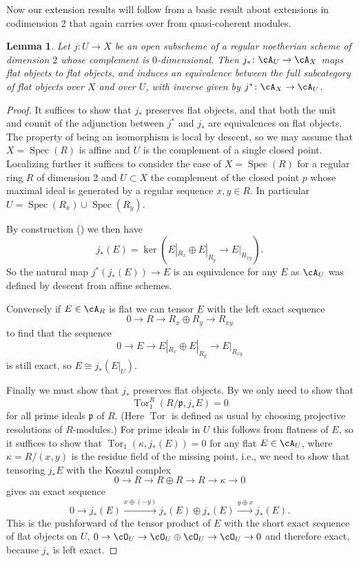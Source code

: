 \documentclass[a4paper]{amsart}
\numberwithin{equation}{section}
\theoremstyle{plain}
\newtheorem{lem}[thm]{Lemma}
\theoremstyle{definition}
\DeclareMathOperator{\Spec}{Spec}
\DeclareMathOperator{\Tor}{Tor}
\newcommand{\co}{\colon}
\def\cp{\mathfrak{p}}
\begin{document}
Now our extension results will follow from a basic result about extensions in codimension 2 that again carries over from quasi-coherent modules.

\begin{lem} \label{L:abelian_flatness}
	Let $j \co U \to X$ be an open subscheme of a regular noetherian scheme of dimension $2$ whose complement is $0$-dimensional. Then $j_\ast \co\cA_{U} \to \cA_X$ maps flat objects to flat objects, and induces an equivalence between the full subcategory of flat objects over $X$ and over $U$, with inverse given by $j^\ast \co \cA_X \to \cA_U$.
\end{lem}
\begin{proof}
	It suffices to show that $j_\ast$ preserves flat objects, and that both the unit and counit of the adjunction between $j^\ast$ and $j_\ast$ are equivalences on flat objects. The property of being an isomorphism is local by descent, so we may assume that $X = \Spec(R)$ is affine and $U$ is the complement of a single closed point. Localizing further it suffices to consider the case of $X = \Spec(R)$ for a regular ring $R$ of dimension $2$ and $U \subset X$ the complement of the closed point $p$ whose maximal ideal is generated by a regular sequence $x,y \in R$. In particular $U=\Spec(R_{x}) \cup \Spec(R_{y})$.
	
	By construction () we then have
	$$ j_*(E) = \ker( E|_{R_{x}} \oplus E|_{R_{y}}\to E|_{R_{xy}}).$$
	So the natural map $j^\ast(j_\ast(E)) \to E$ is an equivalence for any $E$ as $\cA_{U}$ was defined by descent from affine schemes. 
	
	Conversely if $E\in \cA_R$ is flat we can tensor $E$ with the left exact sequence 
	$$ 0 \to R \to R_{x}\oplus R_{y} \to R_{xy}$$ 
	to find that the sequence 
	$$ 0 \to E \to  E|_{R_{x}} \oplus E|_{R_{y}}\to E|_{R_{xy}}$$ is still exact, so $E \cong j_*(E|_U)$.
	
	Finally we must show that $j_\ast$ preserves flat objects. By \cite[Lem.~C1.12]{artin-zhang} we only need to show that $$\Tor_1^R(R/\cp,j_*E)=0$$ for all prime ideals $\cp$ of $R$. (Here $\Tor$ is defined as usual by choosing projective resolutions of $R$-modules.) 
	For prime ideals in $U$ this follows from flatness of $E$, so it suffices to show that $\Tor_1(\kappa, j_\ast(E)) = 0$ for any flat $E \in \cA_U$, where $\kappa=R/(x,y)$ is the residue field of the missing point, i.e., we need to show that tensoring $j_*E$ with the Koszul complex
	$$ 0 \to R \to R\oplus R \to R \to \kappa \to 0$$
	gives an exact sequence
	\[
	0 \to j_\ast(E) \xrightarrow{x \oplus (-y) } j_\ast(E) \oplus j_\ast(E) \xrightarrow{y \oplus x} j_\ast(E).
	\]
	This is the pushforward of the tensor product of $E$ with the short exact sequence of flat objects on $U$, $0 \to \cO_U \to \cO_U \oplus \cO_U \to \cO_U \to 0$ and therefore exact, because $j_\ast$ is left exact.
\end{proof}
\end{document}
